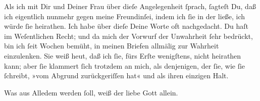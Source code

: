 \pstart
           Als ich \label{K_L03389-8v}\label{K_L03389-8} mit Dir und Deiner Frau über dieſe Angelegenheit{ }ſprach,{ }ſagteſt Du, daß ich eigentlich nunmehr
               gegen  meine Freundinſei, indem ich{ }ſie in {\pb}der \label{K_L03389-9v}\label{K_L03389-9} ließe, ich würde ſie
               heirathen. Ich habe über dieſe Deine Worte oft nachgedacht. \strikeout{\textcolor{gray}{D}} Du haſt im Weſentlichen Recht; und da mich der Vorwurf der Unwahrheit{ }ſehr
               bedrückt, bin ich{ }ſeit Wochen bemüht, in meinen Briefen allmälig zur Wahrheit
               einzulenken. Sie weiß heut, daß ich{ }ſie, fürs Erſte wenigſtens, nicht heirathen kann;
               aber{ }ſie klammert{ }ſich trotzdem an mich, als  denjenigen, der{ }ſie, wie{ }ſie{ }ſchreibt, »vom Abgrund zurückgeriſſen hat« und
               als ihren einzigen Halt.\pend
           
\pstart
           Was aus Alledem werden{ }ſoll, weiß der liebe Gott allein.\pend
           
